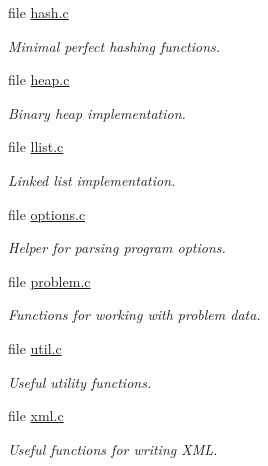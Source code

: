 \begin{CompactItemize}
\item 
file \hyperlink{lib_2common_2hash_8c}{hash.c}
\begin{CompactList}\small\item\em Minimal perfect hashing functions. \item\end{CompactList}

\item 
file \hyperlink{heap_8c}{heap.c}
\begin{CompactList}\small\item\em Binary heap implementation. \item\end{CompactList}

\item 
file \hyperlink{llist_8c}{llist.c}
\begin{CompactList}\small\item\em Linked list implementation. \item\end{CompactList}

\item 
file \hyperlink{options_8c}{options.c}
\begin{CompactList}\small\item\em Helper for parsing program options. \item\end{CompactList}

\item 
file \hyperlink{problem_8c}{problem.c}
\begin{CompactList}\small\item\em Functions for working with problem data. \item\end{CompactList}

\item 
file \hyperlink{util_8c}{util.c}
\begin{CompactList}\small\item\em Useful utility functions. \item\end{CompactList}

\item 
file \hyperlink{xml_8c}{xml.c}
\begin{CompactList}\small\item\em Useful functions for writing XML. \item\end{CompactList}


\end{CompactItemize}

